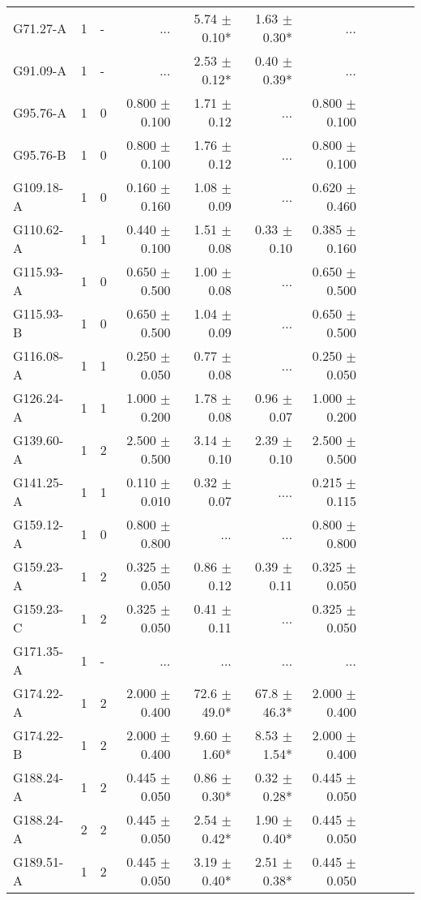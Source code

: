 \documentclass[printer]{aa}
\begin{document}
\begin{table*}[t]
\begin{tabular}{l l l r r r r r r r r}
G71.27-A & 1 & - & ... & 5.74 $\pm$ 0.10* & 1.63 $\pm$ 0.30* & ... \\
G91.09-A & 1 & - & ... & 2.53 $\pm$ 0.12* & 0.40 $\pm$ 0.39* & ... \\
G95.76-A & 1 & 0 & 0.800 $\pm$ 0.100 & 1.71 $\pm$ 0.12 & ... & 0.800 $\pm$ 0.100 \\
G95.76-B & 1 & 0 & 0.800 $\pm$ 0.100 & 1.76 $\pm$ 0.12 & ... & 0.800 $\pm$ 0.100 \\
G109.18-A & 1 & 0 & 0.160 $\pm$ 0.160 & 1.08 $\pm$ 0.09 & ... & 0.620 $\pm$ 0.460 \\
G110.62-A & 1 & 1 & 0.440 $\pm$ 0.100 & 1.51 $\pm$ 0.08 & 0.33 $\pm$ 0.10 & 0.385 $\pm$ 0.160 \\
G115.93-A & 1 & 0 & 0.650 $\pm$ 0.500 & 1.00 $\pm$ 0.08 & ... & 0.650 $\pm$ 0.500 \\
G115.93-B & 1 & 0 & 0.650 $\pm$ 0.500 & 1.04 $\pm$ 0.09 & ... & 0.650 $\pm$ 0.500 \\
G116.08-A & 1 & 1 & 0.250 $\pm$ 0.050 & 0.77 $\pm$ 0.08 & ... & 0.250 $\pm$ 0.050 \\
G126.24-A & 1 & 1 & 1.000 $\pm$ 0.200 & 1.78 $\pm$ 0.08 & 0.96 $\pm$ 0.07 & 1.000 $\pm$ 0.200 \\
G139.60-A & 1 & 2 & 2.500 $\pm$ 0.500 & 3.14 $\pm$ 0.10 & 2.39 $\pm$ 0.10 & 2.500 $\pm$ 0.500 \\
G141.25-A & 1 & 1 & 0.110 $\pm$ 0.010 & 0.32 $\pm$ 0.07 & .... & 0.215 $\pm$ 0.115 \\
G159.12-A & 1 & 0 & 0.800 $\pm$ 0.800 & ... & ... & 0.800 $\pm$ 0.800 \\
G159.23-A & 1 & 2 & 0.325 $\pm$ 0.050 & 0.86 $\pm$ 0.12 & 0.39 $\pm$ 0.11 & 0.325 $\pm$ 0.050 \\
G159.23-C & 1 & 2 & 0.325 $\pm$ 0.050 & 0.41 $\pm$ 0.11 & ... & 0.325 $\pm$ 0.050 \\
G171.35-A & 1 & - & ... & ... & ... & ... \\
G174.22-A & 1 & 2 & 2.000 $\pm$ 0.400 & 72.6 $\pm$ 49.0* &	67.8 $\pm$ 46.3* & 2.000 $\pm$ 0.400 \\
G174.22-B & 1 & 2 & 2.000 $\pm$ 0.400 & 9.60 $\pm$ 1.60* & 8.53 $\pm$ 1.54* & 2.000 $\pm$ 0.400 \\
G188.24-A & 1 & 2 & 0.445 $\pm$ 0.050 & 0.86 $\pm$ 0.30* & 0.32 $\pm$ 0.28* & 0.445 $\pm$ 0.050 \\
G188.24-A & 2 & 2 & 0.445 $\pm$ 0.050 & 2.54 $\pm$ 0.42* & 1.90 $\pm$ 0.40* & 0.445 $\pm$ 0.050 \\
G189.51-A & 1 & 2 & 0.445 $\pm$ 0.050 & 3.19 $\pm$ 0.40* & 2.51 $\pm$ 0.38* & 0.445 $\pm$ 0.050 \\

\end{tabular}
\end{table*}
\end{document}
